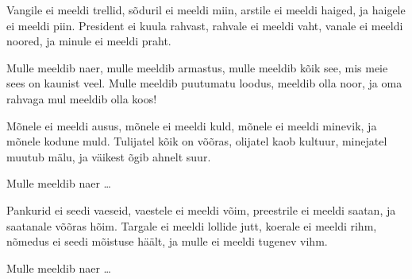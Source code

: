 Vangile ei meeldi trellid, 
s\~oduril ei meeldi miin,
arstile ei meeldi haiged, 
ja haigele ei meeldi piin.
President ei kuula rahvast,
rahvale ei meeldi vaht,
vanale ei meeldi noored,
ja minule ei meeldi praht.

Mulle meeldib naer,
mulle meeldib armastus,
mulle meeldib k\~oik see, 
mis meie sees on kaunist veel.
Mulle meeldib puutumatu loodus, 
meeldib olla noor,
ja oma rahvaga mul meeldib olla koos!

\clearpage M\~onele ei meeldi ausus, 
m\~onele ei meeldi kuld,
m\~onele ei meeldi minevik,
ja m\~onele kodune muld.
Tulijatel k\~oik on v\~o\~oras, 
olijatel kaob kultuur,
minejatel muutub m\"alu,
ja v\"aikest \~ogib ahnelt suur.

Mulle meeldib naer \ldots

Pankurid ei seedi vaeseid,
vaestele ei meeldi v\~oim,
preestrile ei meeldi saatan,
ja saatanale v\~o\~oras h\~oim.
Targale ei meeldi lollide jutt,
koerale ei meeldi rihm,
n\~omedus ei seedi m\~oistuse h\"a\"alt,
ja mulle ei meeldi tugenev vihm.

Mulle meeldib naer \ldots